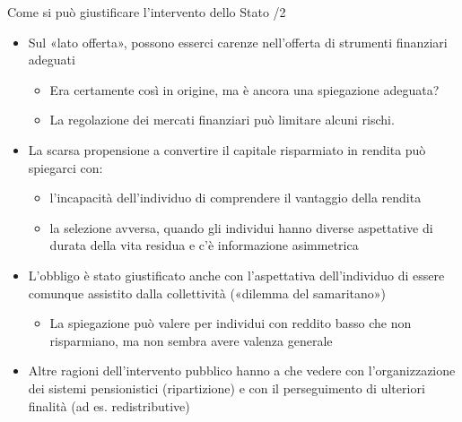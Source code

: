 \documentclass[11pt]{beamer}
\begin{document}
\begin{frame}{Come si può giustificare l'intervento dello Stato /2}
\begin{itemize}
\item Sul «lato offerta», possono esserci carenze nell'offerta di strumenti
finanziari adeguati
\begin{itemize}
\item Era certamente così in origine, ma è ancora una spiegazione adeguata?
\item La regolazione dei mercati finanziari può limitare alcuni rischi.
\end{itemize}
\item La scarsa propensione a convertire il capitale risparmiato in rendita può
spiegarci con:
\begin{itemize}
\item l'incapacità dell'individuo di comprendere il vantaggio della rendita
\item la \alert{selezione avversa}, quando gli individui hanno diverse aspettative di
durata della vita residua e c'è informazione asimmetrica
\end{itemize}
\item L'obbligo è stato giustificato anche con l'aspettativa dell'individuo di
essere comunque assistito dalla collettività («dilemma del samaritano»)
\begin{itemize}
\item La spiegazione può valere per individui con reddito basso che non
risparmiano, ma non sembra avere valenza generale
\end{itemize}
\item Altre ragioni dell'intervento pubblico hanno a che vedere con
l'organizzazione dei sistemi pensionistici (ripartizione) e con il
perseguimento di ulteriori finalità (ad es. redistributive)
\end{itemize}
\end{frame}
\end{document}
